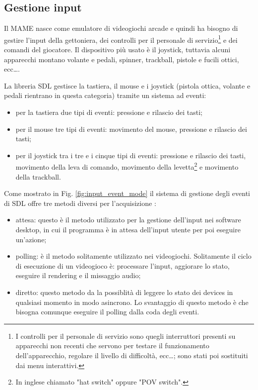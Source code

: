 \subsection{Gestione input}
Il MAME nasce come emulatore di videogiochi arcade e quindi ha bisogno di gestire l'input della gettoniera, dei controlli per il personale di servizio\footnote{I controlli per il personale di servizio sono quegli interruttori presenti su apparecchi non recenti che servono per testare il funzionamento dell'apparecchio, regolare il livello di difficoltà, ecc\dots; sono stati poi sostituiti dai menu interattivi.} e dei comandi del giocatore. Il dispositivo più usato è il joystick, tuttavia alcuni apparecchi montano volante e pedali, spinner, trackball, pistole e fucili ottici, ecc\dots \parencite{Il_progetto_MAME}.

La libreria SDL gestisce la tastiera, il mouse e i joystick (pistola ottica, volante e pedali rientrano in questa categoria) tramite un sistema ad eventi:

\begin{itemize}
	\item per la tastiera due tipi di eventi: pressione e rilascio dei tasti;
	\item per il mouse tre tipi di eventi: movimento del mouse, pressione e rilascio dei tasti;
	\item per il joystick tra i tre e i cinque tipi di eventi: pressione e rilascio dei tasti, movimento della leva di comando, movimento della levetta\footnote{In inglese chiamato "hat switch" oppure "POV switch".} e movimento della trackball.
\end{itemize}

Come mostrato in Fig. \ref{fig:input_event_mode} il sistema di gestione degli eventi di SDL offre tre metodi diversi per l'acquisizione \parencite{FocusOnSDL}:

\begin{itemize}	
	\item attesa: questo è il metodo utilizzato per la gestione dell'input nei software desktop, in cui il programma è in attesa dell'input utente per poi eseguire un'azione;
	\item polling: è il metodo solitamente utilizzato nei videogiochi. Solitamente il ciclo di esecuzione di un videogioco è: processare l'input, aggiorare lo stato, eseguire il rendering e il missaggio audio;
	\item diretto: questo metodo da la possiblità di leggere lo stato dei devices in qualsiasi momento in modo asincrono. Lo svantaggio di questo metodo è che bisogna comunque eseguire il polling dalla coda degli eventi.
\end{itemize}

